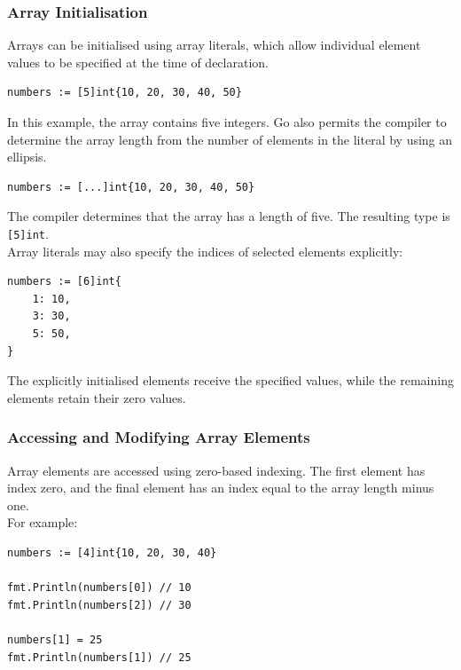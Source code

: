 \subsubsection{Array Initialisation}

Arrays can be initialised using array literals, which allow individual element values to be specified at the time of declaration.

\begin{lstlisting}
numbers := [5]int{10, 20, 30, 40, 50}
\end{lstlisting}

In this example, the array contains five integers. Go also permits the compiler to determine the array length from the number of elements in the literal by using an ellipsis.

\begin{lstlisting}
numbers := [...]int{10, 20, 30, 40, 50}
\end{lstlisting}

The compiler determines that the array has a length of five. The resulting type is \texttt{[5]int}.\\

Array literals may also specify the indices of selected elements explicitly:

\begin{lstlisting}
numbers := [6]int{
    1: 10,
    3: 30,
    5: 50,
}
\end{lstlisting}

The explicitly initialised elements receive the specified values, while the remaining elements retain their zero values.

\subsubsection{Accessing and Modifying Array Elements}

Array elements are accessed using zero-based indexing. The first element has index zero, and the final element has an index equal to the array length minus one.\\

For example:

\begin{lstlisting}
numbers := [4]int{10, 20, 30, 40}

fmt.Println(numbers[0]) // 10
fmt.Println(numbers[2]) // 30

numbers[1] = 25
fmt.Println(numbers[1]) // 25
\end{lstlisting}

